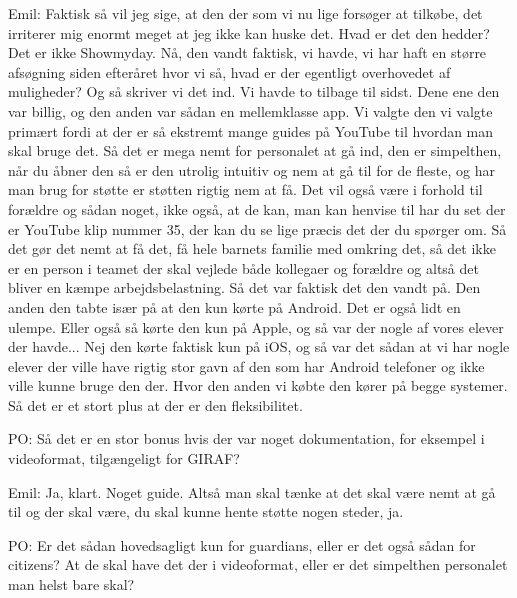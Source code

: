 Emil: 
Faktisk så vil jeg sige, at den der som vi nu lige forsøger at tilkøbe, det irriterer mig enormt meget at jeg ikke kan huske det.
Hvad er det den hedder?
Det er ikke Showmyday.
Nå, den vandt faktisk, vi havde, vi har haft en større afsøgning siden efteråret hvor vi så, hvad er der egentligt overhovedet af muligheder?
Og så skriver vi det ind.
Vi havde to tilbage til sidst. 
Dene ene den var billig, og den anden var sådan en mellemklasse app.
Vi valgte den vi valgte primært fordi at der er så ekstremt mange guides på YouTube til hvordan man skal bruge det.
Så det er mega nemt for personalet at gå ind, den er simpelthen, når du åbner den så er den utrolig intuitiv og nem at gå til for de fleste, og har man brug for støtte er støtten rigtig nem at få.
Det vil også være i forhold til forældre og sådan noget, ikke også, at de kan, man kan henvise til har du set der er YouTube klip nummer 35, der kan du se lige præcis det der du spørger om.
Så det gør det nemt at få det, få hele barnets familie med omkring det, så det ikke er en person i teamet der skal vejlede både kollegaer og forældre og altså det bliver en kæmpe arbejdsbelastning.
Så det var faktisk det den vandt på. 
Den anden den tabte især på at den kun kørte på Android. 
Det er også lidt en ulempe. 
Eller også så kørte den kun på Apple, og så var der nogle af vores elever der havde... 
Nej den kørte faktisk kun på iOS, og så var det sådan at vi har nogle elever der ville have rigtig stor gavn af den som har Android telefoner og ikke ville kunne bruge den der.
Hvor den anden vi købte den kører på begge systemer.
Så det er et stort plus at der er den fleksibilitet. 

PO:
Så det er en stor bonus hvis der var noget dokumentation, for eksempel i videoformat, tilgængeligt for GIRAF?

Emil:
Ja, klart.
Noget guide.
Altså man skal tænke at det skal være nemt at gå til og der skal være, du skal kunne hente støtte nogen steder, ja.

PO:
Er det sådan hovedsagligt kun for guardians, eller er det også sådan for citizens? At de skal have det der i videoformat, eller er det simpelthen personalet man helst bare skal?

